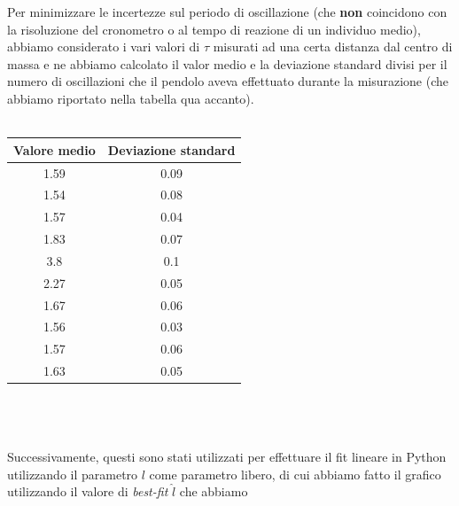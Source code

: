 \documentclass{article}
\begin{document}
\begin{minipage}{0.5\textwidth} \vspace{1cm}
Per minimizzare le incertezze sul periodo di oscillazione (che \textbf{non} coincidono con la risoluzione del cronometro o al tempo di reazione di un individuo medio), abbiamo considerato i vari valori di $\tau$ misurati ad una certa distanza dal centro di massa e ne abbiamo calcolato il valor medio e la deviazione standard divisi per il numero di oscillazioni che il pendolo aveva effettuato durante la misurazione (che abbiamo riportato nella tabella qua accanto). \\ \\
\end{minipage}
\hspace{0.125\textwidth}
\begin{minipage}{0.365\textwidth}
		\begin{tabular}{| c | c |} \hline
			 \textbf{Valore medio} & \textbf{Deviazione standard} \\
			 \hline
			 1.59 & 0.09 \\ \hline
			 1.54 & 0.08 \\ \hline
			 1.57 & 0.04 \\ \hline
			 1.83 & 0.07 \\ \hline
			 3.8 & 0.1 \\ \hline
			 2.27 & 0.05 \\ \hline
			 1.67 & 0.06 \\ \hline
			 1.56 & 0.03 \\ \hline
			 1.57 & 0.06 \\ \hline
			 1.63 & 0.05 \\ \hline
		\end{tabular}
\end{minipage} \\ \\ \\
Successivamente, questi sono stati utilizzati per effettuare il fit lineare in Python utilizzando il parametro $l$ come parametro libero, di cui abbiamo fatto il grafico utilizzando il valore di \emph{best-fit} $\hat{l}$ che abbiamo\\
\end{document}
